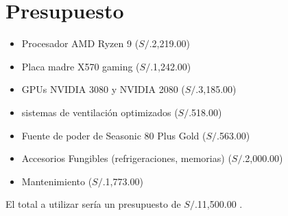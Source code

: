 \newpage
\section{Presupuesto}

\begin{itemize}
    \item Procesador AMD Ryzen 9  ($S/.$2,219.00)
    \item Placa madre X570 gaming  ($S/.$1,242.00)
    \item GPUs NVIDIA 3080 y NVIDIA 2080 ($S/.$3,185.00)
    \item sistemas de ventilación optimizados ($S/.$518.00)
    \item Fuente de poder de Seasonic 80 Plus Gold ($S/.$563.00)
    \item Accesorios Fungibles (refrigeraciones, memorias) ($S/.$2,000.00)
    \item Mantenimiento ($S/.$1,773.00)

\end{itemize}

El total a utilizar sería un presupuesto de $S/.$11,500.00 .
